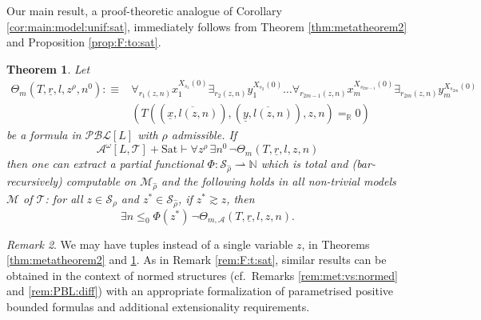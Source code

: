 \documentclass[11pt]{amsart}
\newtheorem{theorem}{Theorem}[section]
\theoremstyle{definition}
\theoremstyle{remark}
\newtheorem{remark}[theorem]{Remark}
\def\RR{\mathbb{R}}
\begin{document}
Our main result, a proof-theoretic analogue of Corollary \ref{cor:main:model:unif:sat}, immediately follows from Theorem \ref{thm:metatheorem2} and Proposition \ref{prop:F:to:sat}.
\begin{theorem}
\label{thm:meta:main}
     Let
 \begin{align*}
 \Theta_m(T,\underline{r},l,z^\rho,n^0):\equiv&\forall_{r_1(z,n)} x_1^{X_{s_1}(0)} \exists_{r_2(z,n)} y_1^{X_{s_2}(0)} \ldots \forall_{r_{2m-1}(z,n)} x_m^{X_{s_{2m-1}}(0)}\exists_{r_{2m}(z,n)} y_m^{X_{s_{2m}}(0)}\,\\&(T((\overline{\underline{x},l(z,n)}),(\overline{\underline{y},l(z,n)}),z,n)=_\RR 0)
 \end{align*}
be a formula in $\mathcal{PBL}[L]$ with  $\rho$ admissible. If
\[
\mathcal{A}^\omega[L,\mathcal{T}]+\mathrm{Sat}\vdash \forall z^\rho\, \exists n^0\,\neg\Theta_{m}(T,\underline{r},l,z,n)
\]
then one can extract a partial functional $\Phi:\mathcal{S}_{\widehat{\rho}}\rightharpoonup\mathbb{N}$ which is total and (bar-recursively) computable on $\mathcal{M}_{\widehat{\rho}}$ and the following holds in all non-trivial models $\mathscr{M}$ of $\mathcal{T}$: for all $z\in \mathcal{S}_\rho$ and $z^*\in \mathcal{S}_{\widehat{\rho}}$, if $z^*\gtrsim z$, then
\[
 \exists n\leq_0\Phi(z^*)\,\neg\Theta_{m,\mathcal{A}}(T,\underline{r},l,z,n).
\]
\end{theorem}

\begin{remark}
    We may have tuples instead of a single variable $z$, in Theorems \ref{thm:metatheorem2} and \ref{thm:meta:main}. As in Remark \ref{rem:F:t:sat}, similar results can be obtained in the context of normed structures (cf.\ Remarks \ref{rem:met:vs:normed} and \ref{rem:PBL:diff}) with an appropriate formalization of parametrised positive bounded formulas and additional extensionality requirements.
\end{remark}







\end{document}
